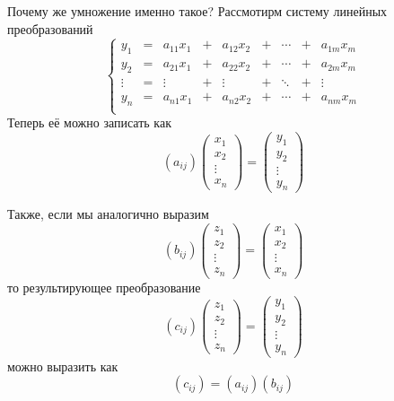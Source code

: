 Почему же умножение именно такое? Рассмотирм систему линейных преобразований
$$\left\{
\begin{array}{ccccccccc}
y_1 &= &a_{11} x_1 &+ &a_{12} x_2 &+ &\cdots &+ &a_{1m} x_m \\
y_2 &= &a_{21} x_1 &+ &a_{22} x_2 &+ &\cdots &+ &a_{2m} x_m \\
\vdots &= &\vdots &+ &\vdots    &+ &\ddots &+ &\vdots \\
y_n &= &a_{n1} x_1 &+ &a_{n2} x_2 &+ &\cdots &+ &a_{nm} x_m \\
\end{array}\right.
$$
Теперь её можно записать как
$$(a_{ij})\left(\begin{matrix}x_1 \\ x_2 \\ \vdots \\ x_n\end{matrix}\right) = \left(\begin{matrix}y_1 \\ y_2 \\ \vdots \\ y_n\end{matrix}\right)$$

Также, если мы аналогично выразим
$$
(b_{ij})\left(\begin{matrix}z_1 \\ z_2 \\ \vdots \\ z_n\end{matrix}\right) = \left(\begin{matrix}x_1 \\ x_2 \\ \vdots \\ x_n\end{matrix}\right)
$$
то результирующее преобразование
$$
(c_{ij})\left(\begin{matrix}z_1 \\ z_2 \\ \vdots \\ z_n\end{matrix}\right) = \left(\begin{matrix}y_1 \\ y_2 \\ \vdots \\ y_n\end{matrix}\right)
$$
можно выразить как
$$(c_{ij}) = (a_{ij})(b_{ij})$$

